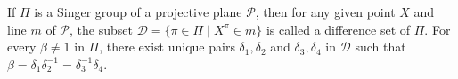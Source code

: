 If $\Pi$ is a Singer group of a projective plane $\mathcal{P}$, then for any given point $X$ and line $m$ of $\mathcal{P}$, the subset $\mathcal{D} = \{\pi \in \Pi \mid X^\pi \in m\}$ is called a difference set of $\Pi$. For every $\beta \neq 1$ in $\Pi$, there exist unique pairs $\delta_1, \delta_2$ and $\delta_3, \delta_4$ in $\mathcal{D}$ such that $\beta = \delta_1 \delta_2^{-1} = \delta_3^{-1} \delta_4$.

